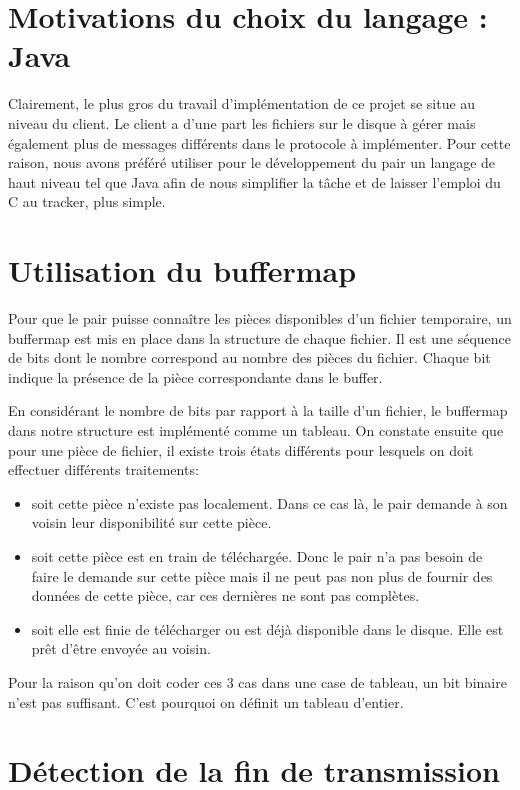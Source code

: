 \section{Motivations du choix du langage : Java} 
 
Clairement, le plus gros du travail d'implémentation de ce projet se situe au niveau du client. 
Le client a d'une part les fichiers sur le disque à gérer mais également plus de messages différents dans le protocole à implémenter. Pour cette raison, nous avons préféré utiliser pour le développement du pair un langage de haut niveau tel que Java afin de nous simplifier la tâche et de laisser l'emploi du C au tracker, plus simple. 
 
\section{Utilisation du buffermap} 
 
Pour que le pair puisse connaître les pièces disponibles d'un fichier temporaire, un buffermap est mis en place dans la structure de chaque fichier. Il est une séquence de bits dont le nombre correspond au nombre des pièces du fichier. Chaque bit indique la présence de la pièce correspondante dans le buffer. 
 
En considérant le nombre de bits par rapport à la taille d'un fichier, le buffermap dans notre structure est implémenté comme un tableau. On constate ensuite que pour une pièce de fichier, il existe trois états différents pour lesquels on doit effectuer différents traitements: 
\begin{itemize} 
\item soit cette pièce n'existe pas localement. Dans ce cas là, le pair demande à son voisin leur disponibilité sur cette pièce. 
\item soit cette pièce est en train de téléchargée. Donc le pair n'a pas besoin de faire le demande sur cette pièce mais il ne peut pas non plus de fournir des données de cette pièce, car ces dernières ne sont pas complètes. 
\item soit elle est finie de télécharger ou est déjà disponible dans le disque. Elle est prêt d'être envoyée au voisin. 
\end{itemize} 
Pour la raison qu'on doit coder ces 3 cas dans une case de tableau, un bit binaire n'est pas suffisant.  
C'est pourquoi on définit un tableau d'entier. 
 
\section{Détection de la fin de transmission} 
 
